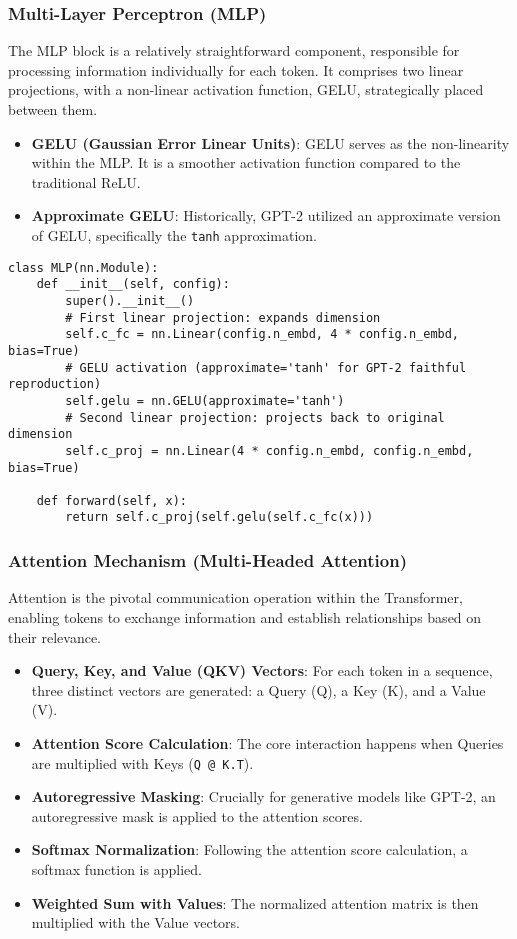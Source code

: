 \subsubsection{Multi-Layer Perceptron (MLP)}
The MLP block is a relatively straightforward component, responsible for processing information individually for each token. It comprises two linear projections, with a non-linear activation function, GELU, strategically placed between them.

\begin{itemize}
    \item \textbf{GELU (Gaussian Error Linear Units)}: GELU serves as the non-linearity within the MLP. It is a smoother activation function compared to the traditional ReLU.
    \item \textbf{Approximate GELU}: Historically, GPT-2 utilized an approximate version of GELU, specifically the \texttt{tanh} approximation.
\end{itemize}

\begin{lstlisting}[caption={MLP Block Structure}]
class MLP(nn.Module):
    def __init__(self, config):
        super().__init__()
        # First linear projection: expands dimension
        self.c_fc = nn.Linear(config.n_embd, 4 * config.n_embd, bias=True)
        # GELU activation (approximate='tanh' for GPT-2 faithful reproduction)
        self.gelu = nn.GELU(approximate='tanh')
        # Second linear projection: projects back to original dimension
        self.c_proj = nn.Linear(4 * config.n_embd, config.n_embd, bias=True)

    def forward(self, x):
        return self.c_proj(self.gelu(self.c_fc(x)))
\end{lstlisting}

\subsubsection{Attention Mechanism (Multi-Headed Attention)}
Attention is the pivotal communication operation within the Transformer, enabling tokens to exchange information and establish relationships based on their relevance.

\begin{itemize}
    \item \textbf{Query, Key, and Value (QKV) Vectors}: For each token in a sequence, three distinct vectors are generated: a Query (Q), a Key (K), and a Value (V).
    \item \textbf{Attention Score Calculation}: The core interaction happens when Queries are multiplied with Keys (\texttt{Q @ K.T}).
    \item \textbf{Autoregressive Masking}: Crucially for generative models like GPT-2, an autoregressive mask is applied to the attention scores.
    \item \textbf{Softmax Normalization}: Following the attention score calculation, a softmax function is applied.
    \item \textbf{Weighted Sum with Values}: The normalized attention matrix is then multiplied with the Value vectors.
\end{itemize}

